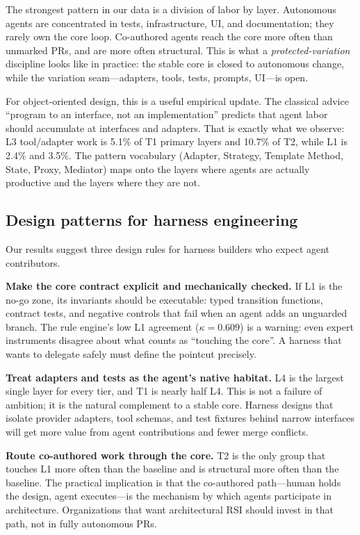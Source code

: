 \documentclass[sigconf,review]{acmart}
\begin{document}
The strongest pattern in our data is a division of labor by layer. Autonomous agents are concentrated in tests, infrastructure, UI, and documentation; they rarely own the core loop. Co-authored agents reach the core more often than unmarked PRs, and are more often structural. This is what a \emph{protected-variation} discipline looks like in practice: the stable core is closed to autonomous change, while the variation seam---adapters, tools, tests, prompts, UI---is open.

For object-oriented design, this is a useful empirical update. The classical advice ``program to an interface, not an implementation'' \citep{gof1994,parnas1972} predicts that agent labor should accumulate at interfaces and adapters. That is exactly what we observe: L3 tool/adapter work is 5.1\% of T1 primary layers and 10.7\% of T2, while L1 is 2.4\% and 3.5\%. The pattern vocabulary (Adapter, Strategy, Template Method, State, Proxy, Mediator) maps onto the layers where agents are actually productive and the layers where they are not.

\subsection{Design patterns for harness engineering}

Our results suggest three design rules for harness builders who expect agent contributors.

\textbf{Make the core contract explicit and mechanically checked.} If L1 is the no-go zone, its invariants should be executable: typed transition functions, contract tests, and negative controls that fail when an agent adds an unguarded branch. The rule engine's low L1 agreement ($\kappa=0.609$) is a warning: even expert instruments disagree about what counts as ``touching the core''. A harness that wants to delegate safely must define the pointcut precisely.

\textbf{Treat adapters and tests as the agent's native habitat.} L4 is the largest single layer for every tier, and T1 is nearly half L4. This is not a failure of ambition; it is the natural complement to a stable core. Harness designs that isolate provider adapters, tool schemas, and test fixtures behind narrow interfaces will get more value from agent contributions and fewer merge conflicts.

\textbf{Route co-authored work through the core.} T2 is the only group that touches L1 more often than the baseline and is structural more often than the baseline. The practical implication is that the co-authored path---human holds the design, agent executes---is the mechanism by which agents participate in architecture. Organizations that want architectural RSI should invest in that path, not in fully autonomous PRs.
\end{document}
